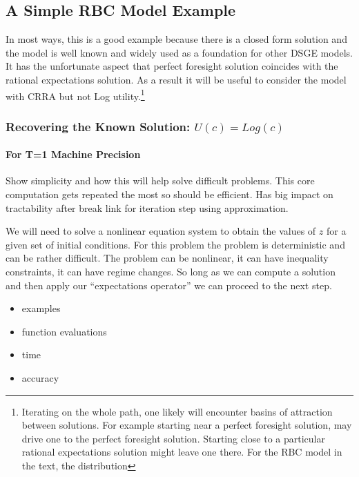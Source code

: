\documentclass[12pt]{article}
\begin{document}
\subsection{A Simple RBC Model Example}
\label{sec:simple-rbc-model-1}


In most ways, this is a good example because there is a closed form solution
and the model is well known and widely used as a foundation for other DSGE
models.  It has the unfortunate aspect that perfect foresight solution 
coincides with the rational expectations solution.  As a result it will be
useful to consider the model with CRRA but not Log utility.\footnote{Iterating on the whole path, one likely will encounter basins of attraction between solutions.  For example starting near a perfect foresight solution, may drive one to the perfect foresight solution.  Starting close to a particular rational expectations solution might leave one there.  For the RBC model in the text, the distribution}


\subsubsection{Recovering the Known Solution:  $U(c) = Log(c)$}
\label{sec:recov-known-solut}




\paragraph{For T=1 Machine Precision}
\label{sec:t=1}

Show simplicity and how this will help solve difficult problems.  
This core computation gets repeated the most so should be efficient. Has big
impact on tractability after break link for iteration step using approximation.


We will need to solve a nonlinear equation system to obtain the values of $z$ for a given set of initial conditions.  For this problem the problem is 
deterministic and can be rather difficult. 
The problem can be nonlinear, it can
have inequality constraints, it can have regime changes.  So long as we can
compute a solution and then apply our ``expectations operator'' we can 
proceed to the next step.

\begin{itemize}
\item examples
\item function evaluations
\item time
\item accuracy
\end{itemize}
\end{document}
